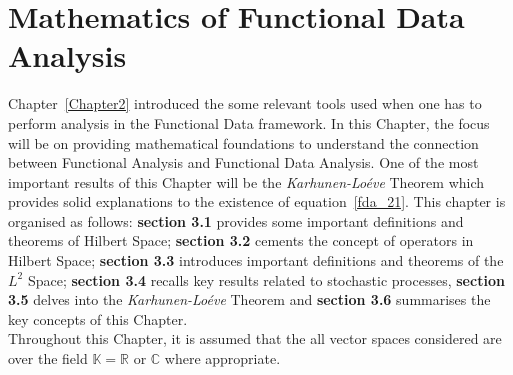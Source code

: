 
\chapter{Mathematics of Functional Data Analysis} %

\label{Chapter3} %



Chapter~\ref{Chapter2} introduced the some relevant tools used when one has to perform analysis in the Functional Data framework. In this Chapter, the focus will be on providing mathematical foundations to understand the connection between Functional Analysis and Functional Data Analysis. One of the most important results of this Chapter will be the \textit{Karhunen-Lo\'{e}ve} Theorem which provides solid explanations to the existence of equation~\eqref{fda_21}. This chapter is organised as follows: \textbf{section 3.1} provides some important definitions and theorems of Hilbert Space; \textbf{section 3.2} cements the concept of operators in Hilbert Space; \textbf{section 3.3} introduces important definitions and theorems of the $L^2$ Space; \textbf{section 3.4} recalls key results related to stochastic processes, \textbf{section 3.5} delves into the \textit{Karhunen-Lo\'{e}ve} Theorem and \textbf{section 3.6} summarises the key concepts of this Chapter.\\
Throughout this Chapter, it is assumed that the all vector spaces considered are over the field $\mathbb{K} = \mathbb{R}$ or $\mathbb{C}$ where appropriate.
\clearpage

